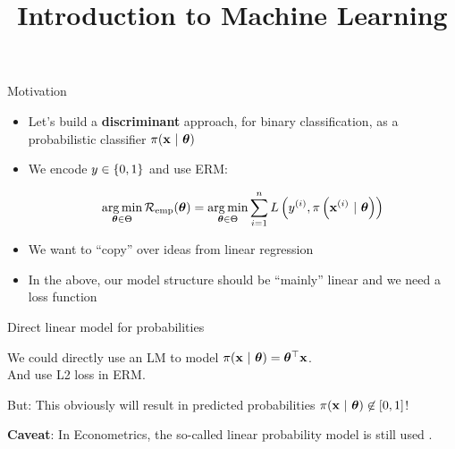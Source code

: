 \documentclass[11pt,compress,t,notes=noshow, xcolor=table]{beamer}
\title{Introduction to Machine Learning}
\begin{document}

\begin{vbframe}{Motivation}

\begin{itemize}

\item Let's build a \textbf{discriminant} approach, for binary classification, as a probabilistic classifier $\pi(\mathbf{x}~|~ \bm{\theta})$

\item We encode $y \in \{0, 1\}$ and use ERM:
  
$$ 
\mathop{\mathrm{arg\,min}}_{\bm{\theta} \in \Theta} \mathcal{R}_{\text{emp}}(\bm{\theta}) = \mathop{\mathrm{arg\,min}}_{\bm{\theta} \in \Theta} \sum\limits_{i=1}^n L\left(y^{(i)}, \pi\left(\mathbf{x}^{(i)} ~|~ \bm{\theta}\right)\right)
$$

\item We want to \enquote{copy} over ideas from linear regression

\item In the above, our model structure should be \enquote{mainly} linear and we need a loss function

\end{itemize}


\end{vbframe}

\begin{vbframe}{Direct linear model for probabilities}

We could directly use an LM to model $\pi(\mathbf{x}~|~ \bm{\theta}) = \bm{\theta}^\top \mathbf{x}$.\\
And use L2 loss in ERM.

\lz 


But: This obviously will result in predicted probabilities $\pi(\mathbf{x}~|~ \bm{\theta}) \not\in [0,1]$!

\textbf{Caveat}: In Econometrics, the so-called linear probability model is still used .

\end{vbframe}
\end{document}
